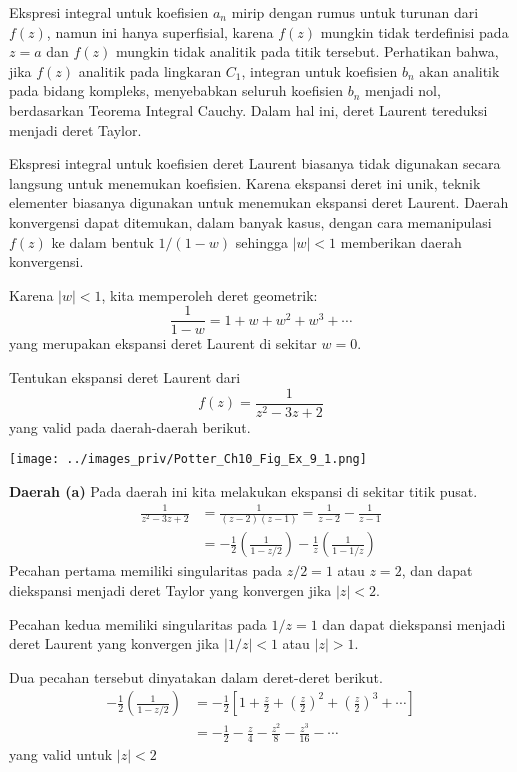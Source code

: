 Ekspresi integral untuk koefisien $a_{n}$ mirip dengan rumus untuk
turunan dari $f(z)$, namun ini hanya superfisial, karena $f(z)$
mungkin tidak terdefinisi pada $z=a$ dan $f(z)$ mungkin tidak analitik
pada titik tersebut. Perhatikan bahwa, jika $f(z)$ analitik pada
lingkaran $C_{1}$, integran untuk koefisien $b_{n}$ akan analitik
pada bidang kompleks, menyebabkan seluruh koefisien $b_{n}$ menjadi
nol, berdasarkan Teorema Integral Cauchy. Dalam hal ini, deret Laurent
tereduksi menjadi deret Taylor.

Ekspresi integral untuk koefisien deret Laurent biasanya tidak digunakan
secara langsung untuk menemukan koefisien. Karena ekspansi deret ini
unik, teknik elementer biasanya digunakan untuk menemukan ekspansi
deret Laurent. Daerah konvergensi dapat ditemukan, dalam banyak kasus,
dengan cara memanipulasi $f(z)$ ke dalam bentuk $1/(1-w)$ sehingga
$|w|<1$ memberikan daerah konvergensi.

Karena $|w| < 1$, kita memperoleh deret geometrik:
\begin{equation*}
\frac{1}{1-w} = 1 + w + w^{2} + w^{3} + \cdots
\end{equation*}
yang merupakan ekspansi deret Laurent di sekitar $w=0$.

\begin{contoh}
Tentukan ekspansi deret Laurent dari
\[
f(z)=\frac{1}{z^{2}-3z+2}
\]
yang valid pada daerah-daerah berikut.

{\centering
\texttt{[image: ../images\_priv/Potter\_Ch10\_Fig\_Ex\_9\_1.png]}
\par}

\end{contoh}

\textbf{Daerah (a)} Pada daerah ini kita melakukan ekspansi di sekitar titik pusat.
\begin{align*}
\frac{1}{z^{2}-3z+2} & =\frac{1}{(z-2)(z-1)}=\frac{1}{z-2}-\frac{1}{z-1}\\
 & =-\frac{1}{2}\left(\frac{1}{1-z/2}\right)-\frac{1}{z}\left(\frac{1}{1-1/z}\right)
\end{align*}
Pecahan pertama memiliki singularitas pada $z/2=1$ atau $z=2$, dan
dapat diekspansi menjadi deret Taylor yang konvergen jika $|z|<2$.

Pecahan kedua memiliki singularitas pada $1/z=1$ dan dapat diekspansi
menjadi deret Laurent yang konvergen jika $|1/z|<1$ atau $|z|>1$.

Dua pecahan tersebut dinyatakan dalam deret-deret berikut.
\begin{align*}
-\frac{1}{2}\left(\frac{1}{1-z/2}\right) & =-\frac{1}{2}\left[1+\frac{z}{2}+\left(\frac{z}{2}\right)^{2}+\left(\frac{z}{2}\right)^{3}+\cdots\right]\\
 & =-\frac{1}{2}-\frac{z}{4}-\frac{z^{2}}{8}-\frac{z^{3}}{16}-\cdots
\end{align*}
yang valid untuk $|z|<2$

